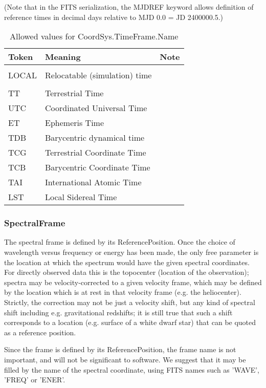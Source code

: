 \documentclass[11pt]{article}
\begin{document}
    
(Note that in the FITS serialization, the MJDREF keyword allows
definition of reference times in decimal days relative to MJD 0.0 = JD 2400000.5.)

\begin{table}[h]
\small
\begin{tabular}{|lll|}
\hline
Token  &  Meaning & Note \\
\hline
&&\\
LOCAL & Relocatable (simulation) time&\\
&&\\
TT      & Terrestrial Time &\\
UTC     & Coordinated Universal Time &\\
ET      & Ephemeris Time&\\
TDB     & Barycentric dynamical time&\\
TCG   & Terrestrial Coordinate Time&\\
TCB  & Barycentric Coordinate Time&\\
TAI  & International Atomic Time&\\
LST  & Local Sidereal Time&\\
\hline
\end{tabular}
\caption{Allowed values for CoordSys.TimeFrame.Name}
\end{table}


\subsubsection{SpectralFrame}

The spectral frame is defined by its ReferencePosition.
Once the choice of wavelength versus frequency or energy
has been made, the only free parameter is the location
at which the spectrum would have the given spectral coordinates.
For directly observed data this is the topocenter (location
of the observation); spectra may be velocity-corrected
to a given velocity frame, which may be defined by
the location which is at rest in that velocity frame (e.g.
the heliocenter). Strictly, the correction may not be just
a velocity shift, but any kind of spectral shift including
e.g. gravitational redshifts; it is still true that such
a shift corresponds to a location (e.g. surface of a white
dwarf star) that can be quoted as a reference position.

Since the frame is defined by its ReferencePosition, the frame
name is not important, and will not be significant to software.
We suggest that it may be filled by the name of the spectral
coordinate, using FITS names such as 'WAVE', 'FREQ' or 'ENER'.
\end{document}
